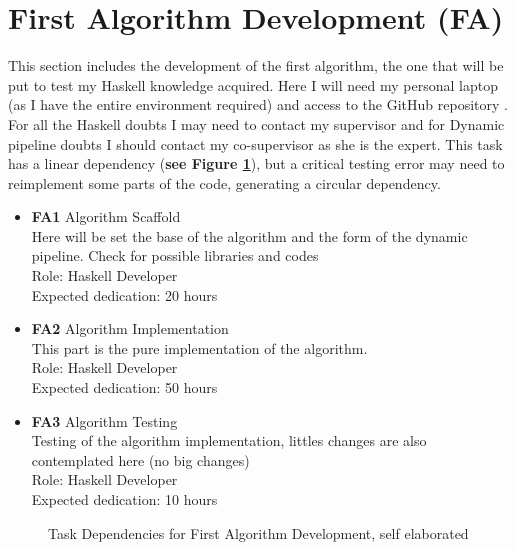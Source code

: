\section{First Algorithm Development \textbf{(FA)}}
This section includes the development of the first algorithm, the one that will be put to test my Haskell knowledge acquired.
Here I will need my personal laptop (as I have the entire environment required) and access to the GitHub repository \cite{GitHubTFG}.
For all the Haskell doubts I may need to contact my supervisor and for Dynamic pipeline doubts I should contact my co-supervisor as she is the expert.
This task has a linear dependency (\textbf{see Figure \ref{FA_dependences}}), but a critical testing error may need to reimplement some parts of the code, generating a circular dependency.
\begin{itemize}
    \item \textbf{FA1} Algorithm Scaffold \\
        Here will be set the base of the algorithm and the form of the dynamic pipeline.
        Check for possible libraries and codes \\
        Role: Haskell Developer\\
        Expected dedication: 20 hours
    \item \textbf{FA2} Algorithm Implementation\\
        This part is the pure implementation of the algorithm. \\
        Role: Haskell Developer \\
        Expected dedication: 50 hours
    \item \textbf{FA3} Algorithm Testing \\
        Testing of the algorithm implementation, littles changes are also contemplated here (no big changes) \\
        Role: Haskell Developer \\
        Expected dedication: 10 hours 
\end{itemize}
\begin{figure}[h]
    \centering
    \caption{Task Dependencies for First Algorithm Development, self elaborated}
    \label{FA_dependences}
\end{figure}

